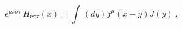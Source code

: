 \begin{equation}
\epsilon ^{\mu \nu \sigma \tau }\,H_{\nu \sigma \tau }(x)=\int \,(dy)f^{\mu
}(x-y)J(y)\ ,
\end{equation}%

